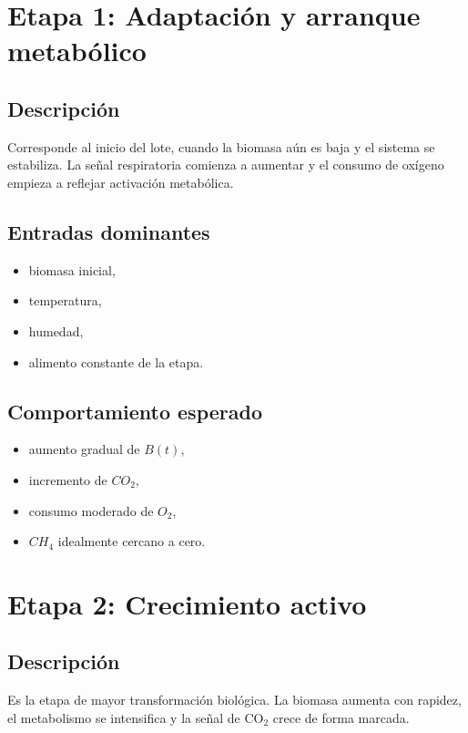 \documentclass[12pt,a4paper]{report}
\begin{document}
\section{Etapa 1: Adaptación y arranque metabólico}

\subsection*{Descripción}
Corresponde al inicio del lote, cuando la biomasa aún es baja y el sistema se estabiliza. La señal respiratoria comienza a aumentar y el consumo de oxígeno empieza a reflejar activación metabólica.

\subsection*{Entradas dominantes}
\begin{itemize}[leftmargin=0.7cm]
    \item biomasa inicial,
    \item temperatura,
    \item humedad,
    \item alimento constante de la etapa.
\end{itemize}

\subsection*{Comportamiento esperado}
\begin{itemize}[leftmargin=0.7cm]
    \item aumento gradual de \(B(t)\),
    \item incremento de \(CO_2\),
    \item consumo moderado de \(O_2\),
    \item \(CH_4\) idealmente cercano a cero.
\end{itemize}

\section{Etapa 2: Crecimiento activo}

\subsection*{Descripción}
Es la etapa de mayor transformación biológica. La biomasa aumenta con rapidez, el metabolismo se intensifica y la señal de CO$_2$ crece de forma marcada.
\end{document}
